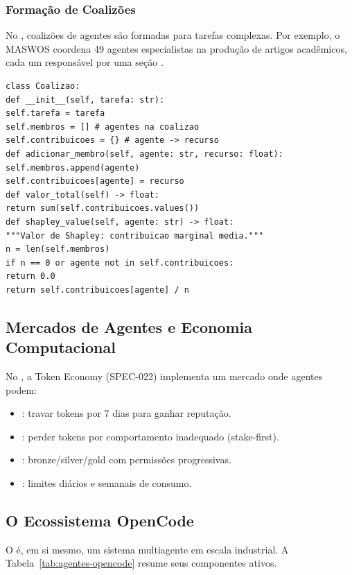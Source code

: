 \subsubsection*{Formação de Coalizões}
No \opencodeeco{}, coalizões de agentes são formadas para tarefas
complexas. Por exemplo, o MASWOS coordena 49 agentes especialistas na
produção de artigos acadêmicos, cada um responsável por uma seção
\cite{opencode2026maswos}.
\begin{lstlisting}[style=pythonstyle]
class Coalizao:
def __init__(self, tarefa: str):
self.tarefa = tarefa
self.membros = [] # agentes na coalizao
self.contribuicoes = {} # agente -> recurso
def adicionar_membro(self, agente: str, recurso: float):
self.membros.append(agente)
self.contribuicoes[agente] = recurso
def valor_total(self) -> float:
return sum(self.contribuicoes.values())
def shapley_value(self, agente: str) -> float:
"""Valor de Shapley: contribuicao marginal media."""
n = len(self.membros)
if n == 0 or agente not in self.contribuicoes:
return 0.0
return self.contribuicoes[agente] / n
\end{lstlisting}
\subsection{Mercados de Agentes e Economia Computacional}
No \opencodeeco{}, a Token Economy (SPEC-022) implementa um mercado onde
agentes podem:
\begin{itemize}
\item {}: travar tokens por 7 dias para ganhar reputação.
\item {}: perder tokens por comportamento inadequado
(stake-first).
\item {}: bronze/silver/gold com permissões progressivas.
\item {}: limites diários e semanais de consumo.
\end{itemize}
\cite{opencode2026token, opencode2026spec038}
\subsection{O Ecossistema OpenCode}
O \opencodeeco{} é, em si mesmo, um sistema multiagente em escala
industrial. A Tabela~\ref{tab:agentes-opencode} resume seus componentes
ativos.
\begin{table}[htb]
\centering
    \small
\caption{Agentes do OpenCode Ecosystem}
\label{tab:agentes-opencode}
\end{table}
